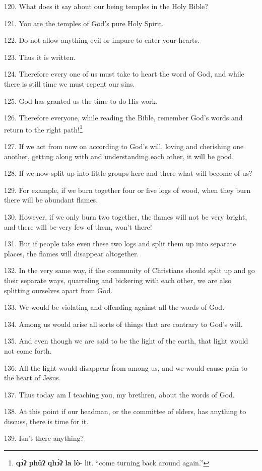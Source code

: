 120. What does it say about our being temples in the Holy Bible?

121. You are the temples of God's pure Holy Spirit.

122. Do not allow anything evil or impure to enter your hearts.

123. Thus it is written.

124. Therefore every one of us must take to heart the word of God, and while there
is still time we must repent our sins.

125. God has granted us the time to do His work.

126. Therefore everyone, while reading the Bible, remember God's words and return
to the right path!\footnote{\textbf{qɔ̀ʔ} \textbf{phûʔ} \textbf{qhɔ̀ʔ} \textbf{la} \textbf{lò}- lit. ``come turning back around again.''}

127. If we act from now on according to God's will, loving and cherishing one another,
getting along with and understanding each other, it will be good.

128. If we now split up into little groups here and there what will become of us?

129. For example, if we burn together four or five logs of wood, when they burn
there will be abundant flames.

130. However, if we only burn two together, the flames will not be very bright,
and there will be very few of them, won't there!

131. But if people take even these two logs and split them up into separate places,
the flames will disappear altogether.

132. In the very same way, if the community of Christians should split up and go
their separate ways, quarreling and bickering with each other, we are also splitting
ourselves apart from God.

133. We would be violating and offending against all the words of God.

134. Among us would arise all sorts of things that are contrary to God's will.

135. And even though we are said to be the light of the earth, that light would
not come forth.

136. All the light would disappear from among us, and we would cause pain to the
heart of Jesus.

137. Thus today am I teaching you, my brethren, about the words of God.

138. At this point if our headman, or the committee of elders, has anything to
discuss, there is time for it.

139. Isn't there anything?

